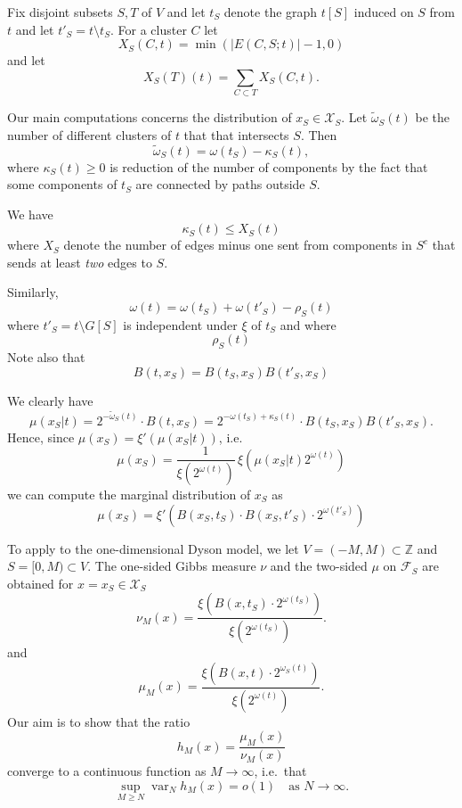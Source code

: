 \documentclass[11pt, a4paper, oneside]{article}
\theoremstyle{definition}
\theoremstyle{remark}
\providecommand{\ZZ}{\mathbb{Z}}
\providecommand{\mscr}{\mathscr}
\providecommand{\opn}{\operatorname}
\providecommand{\var}{\opn{var}}
\providecommand{\ordo}[1]{{o(#1)}}
\providecommand{\tl}{\tilde}
\def\X{\mscr X}
\begin{document}
Fix disjoint subsets $S,T$ of $V$ and let $t_S$ denote the graph $t[S]$ induced on $S$ from $t$ and let $t'_S=t\setminus t_S$. For a cluster $C$ let
\[ X_S(C,t) = \min\left( |E(C,S;t)| - 1, 0\right) \]
and let 
\[ X_S(T)(t) = \sum_{C\subset T} X_S(C,t). \]

Our main computations concerns the distribution of $x_S\in \X_S$. 
Let $\tl\omega_S(t)$ be the number of different clusters of $t$ that that 
intersects $S$. 
Then 
\[
    \tl\omega_S(t) = \omega(t_S) - \kappa_S(t),
\]
where $\kappa_S(t)\ge 0$ is reduction of the number of components
by the fact that some components of $t_S$ are connected by paths outside $S$. 

We have 
\[
    \kappa_S(t) \le X_S(t)
\]
where $X_S$ denote the number of edges minus one sent from components in $S^c$ that sends at least \emph{two} edges to $S$. 

Similarly, 
\[
\omega(t) = \omega(t_S)+\omega(t'_S) - \rho_S(t)
\]
where $t'_S = t\setminus G[S]$ is independent under $\xi$ of $t_S$ and where 
\[
    \rho_S(t) 
\]
Note also that 
\[
    B(t,x_S) = B(t_S,x_S) B(t'_S,x_S) 
\]
 

We clearly have 
\[ 
    \mu(x_S|t) = 2^{-\tl\omega_S(t)} \cdot B(t,x_S) 
    = 2^{-\omega(t_S) + \kappa_S(t)} \cdot B(t_S,x_S) B(t'_S,x_S).
\]
Hence, since  $\mu(x_S)=\xi'(\mu(x_S|t))$, i.e.\
\[
\mu(x_S) = \frac1{\xi(2^{\omega(t)})} \, 
\xi\left(\mu(x_S|t) 2^{\omega(t)}\right)
\] 
we can compute the marginal distribution of $x_S$ as 
\begin{equation}
\mu(x_S) = 
\xi'\left(B(x_S,t_S)\cdot B(x_S,t'_S)\cdot 2^{\omega(t'_S)}\right)
\end{equation}

To apply to the one-dimensional Dyson model, we let $V=(-M,M)\subset\ZZ$ and $S=[0,M)\subset V$. The one-sided Gibbs measure $\nu$ and the two-sided $\mu$ on $\mscr F_S$ are obtained for $x=x_S\in \X_S$
\[
\nu_M(x) = 
\frac
{\xi\left(B(x,t_S)\cdot 2^{\omega(t_S)}\right)}
{\xi(2^{\omega(t_S)})}.
\]
and 
\[
\mu_M(x) = 
\frac
{\xi\left(B(x,t)\cdot 2^{\omega_S(t)}\right)}
{\xi(2^{\omega(t)})}.
\]
Our aim is to show that the ratio 
\[
    h_M(x) = \frac{\mu_M(x)}{\nu_M(x)}
\]
converge to a continuous function as $M\to\infty$, i.e.\ that 
\[
    \sup_{M\ge N} \var_N h_M(x) = \ordo1 \quad\text{as $N\to\infty$}.
\]
\end{document}
